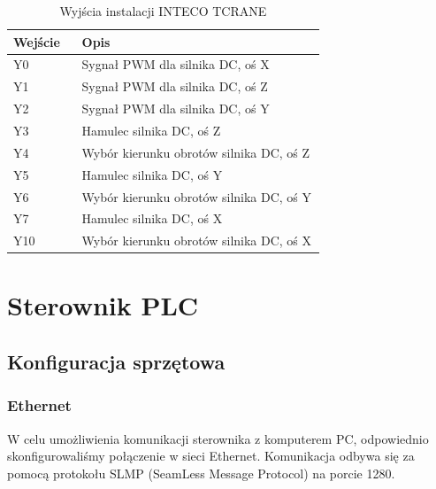 \documentclass{mwrep}
\begin{document}
\begin{table}[H]
    \centering
    \begin{tabular}{|p{0.1\linewidth}|p{0.6\linewidth}|}
	\hline
    Wejście & Opis \\ \hline
    Y0 & Sygnał PWM dla silnika DC, oś X  \\  \hline
	Y1 & Sygnał PWM dla silnika DC, oś Z  \\ \hline
	Y2 & Sygnał PWM dla silnika DC, oś Y  \\ \hline
	Y3 & Hamulec silnika DC, oś Z 		  \\  \hline
	Y4 & Wybór kierunku obrotów silnika DC, oś Z         \\ \hline
	Y5 & Hamulec silnika DC, oś Y 		  \\  \hline
	Y6 & Wybór kierunku obrotów silnika DC, oś Y         \\ \hline
    Y7 & Hamulec silnika DC, oś X 		  \\  \hline
    Y10 & Wybór kierunku obrotów silnika DC, oś X         \\ \hline
	\end{tabular}
	\caption{Wyjścia instalacji INTECO TCRANE}
\end{table}

\chapter{Sterownik PLC}
\label{PLC}

\section{Konfiguracja sprzętowa}
\label{PLC::Konfiguracja}

\subsection{Ethernet}
\label{PLC::Konfiguracja::Ethernet}

W celu umożliwienia komunikacji sterownika z komputerem PC, odpowiednio skonfigurowaliśmy
połączenie w sieci Ethernet. Komunikacja odbywa się za pomocą protokołu SLMP (SeamLess 
Message Protocol) na porcie 1280. 
\end{document}
